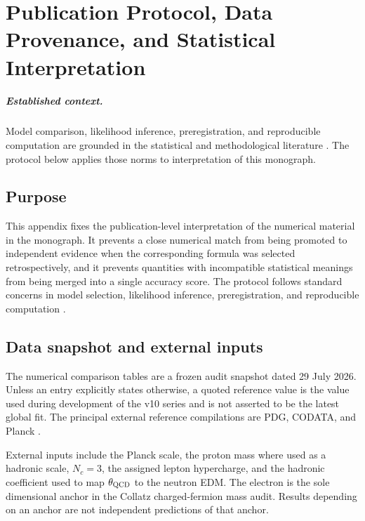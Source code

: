 \chapter{Publication Protocol, Data Provenance, and Statistical Interpretation}
\label{app:publication_protocol}

\paragraph{Established context.}
Model comparison, likelihood inference, preregistration, and reproducible
computation are grounded in the statistical and methodological literature
\cite{Akaike1974,Schwarz1978,Wilks1938,Cowan2011,Nosek2018,Sandve2013}.
The protocol below applies those norms to interpretation of this monograph.


\section{Purpose}
This appendix fixes the publication-level interpretation of the numerical
material in the monograph.  It prevents a close numerical match from being
promoted to independent evidence when the corresponding formula was selected
retrospectively, and it prevents quantities with incompatible statistical
meanings from being merged into a single accuracy score.  The protocol follows
standard concerns in model selection, likelihood inference, preregistration,
and reproducible computation
\cite{Akaike1974,Schwarz1978,Wilks1938,Cowan2011,Nosek2018,Sandve2013}.

\section{Data snapshot and external inputs}
The numerical comparison tables are a frozen audit snapshot dated 29 July 2026.
Unless an entry explicitly states otherwise, a quoted reference value is the
value used during development of the v10 series and is not asserted to be the
latest global fit.  The principal external reference compilations are PDG,
CODATA, and Planck \cite{PDG2024,CODATA2022,Planck2018}.

External inputs include the Planck scale, the proton mass where used as a
hadronic scale, $N_c=3$, the assigned lepton hypercharge, and the hadronic
coefficient used to map $\theta_{\rm QCD}$ to the neutron EDM.  The electron is
the sole dimensional anchor in the Collatz charged-fermion mass audit.  Results
depending on an anchor are not independent predictions of that anchor.

